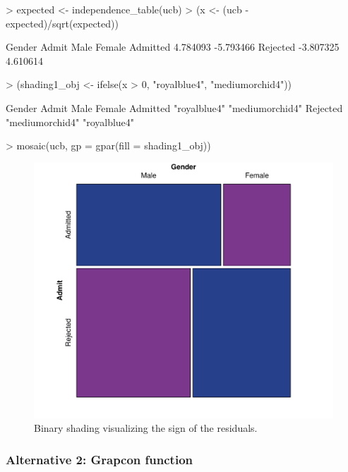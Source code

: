 \documentclass{Z}
\begin{document}
\begin{Schunk}
\begin{Sinput}
> expected <- independence_table(ucb)
> (x <- (ucb - expected)/sqrt(expected))
\end{Sinput}
\begin{Soutput}
          Gender
Admit           Male    Female
  Admitted  4.784093 -5.793466
  Rejected -3.807325  4.610614
\end{Soutput}
\begin{Sinput}
> (shading1_obj <- ifelse(x > 0, "royalblue4", "mediumorchid4"))
\end{Sinput}
\begin{Soutput}
          Gender
Admit      Male            Female         
  Admitted "royalblue4"    "mediumorchid4"
  Rejected "mediumorchid4" "royalblue4"   
\end{Soutput}
\begin{Sinput}
> mosaic(ucb, gp = gpar(fill = shading1_obj))
\end{Sinput}
\end{Schunk}

\begin{figure}[h]
\begin{center}
\includegraphics{strucplot-shading1fig}
\caption{Binary shading visualizing the sign of the residuals.}
\label{fig:binary}
\end{center}
\end{figure}

\subsubsection*{Alternative 2: Grapcon function}
\end{document}
